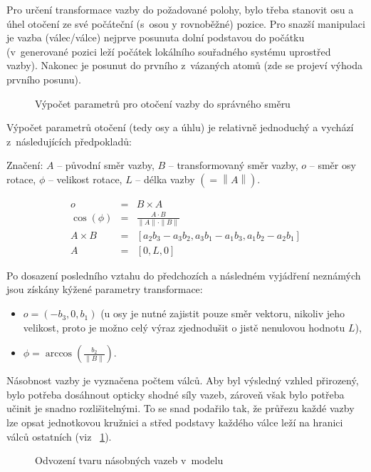 Pro určení transformace vazby do požadované polohy, bylo třeba stanovit osu a
úhel otočení ze své počáteční (s~osou y rovnoběžné) pozice. Pro snazší
manipulaci je vazba (válec/válce) nejprve posunuta dolní podstavou do po\-čát\-ku
(v~generované pozici leží počátek lokálního souřadného systému uprostřed vazby).
Nakonec je posunut do prvního z~vázaných atomů (zde se projeví výhoda prvního
posunu).

\begin{figure}[h]
	\caption{Výpočet parametrů pro otočení vazby do správného směru}
\end{figure}

Výpočet parametrů otočení (tedy osy a úhlu) je relativně jednoduchý a vychází
z~následujících předpokladů:

Značení: $A$ -- původní směr vazby,
		 $B$ -- transformovaný směr vazby,
		 $o$ -- směr osy rotace,
		 $\phi$ -- velikost rotace,
		 $L$ -- délka vazby $\left(=\left\|A\right\|\right)$.

\zlom
\begin{eqnarray*}
o&=&B \times A \\
\cos (\phi) &=& \frac{A\cdot B}{\|A\|\cdot \|B\|} \\
A \times B &=& \left[ a_2 b_3 - a_3 b_2, a_3 b_1 - a_1 b_3, a_1 b_2 - a_2 b_1 \right] \\
A &=& \left[ 0, L, 0\right]
\end{eqnarray*}

Po dosazení posledního vztahu do předchozích a následném vyjádření neznámých
jsou získány kýžené parametry transformace:
\begin{itemize}
	\item $o=\left(-b_3, 0, b_1\right)$ (u osy je nutné zajistit pouze směr
		  vektoru, nikoliv jeho velikost, proto je možno celý výraz zjednodušit
		  o jistě nenulovou hodnotu $L$),
	\item $\phi = \arccos \left(\frac{b_2}{\|B\|}\right)$.
\end{itemize}

Násobnost vazby je vyznačena počtem válců. Aby byl výsledný vzhled přirozený,
bylo potřeba dosáhnout opticky shodné síly vazeb, zároveň však bylo potřeba
učinit je snadno rozlišitelnými. To se snad podařilo tak, že průřezu každé vazby
lze opsat jednotkovou kružnici a střed podstavy každého válce leží na hranici
válců ostatních (viz {\figurename}~\ref{pic:vazba}).

\begin{figure}[h]
	\caption{Odvození tvaru násobných vazeb v~modelu}\label{pic:vazba}
\end{figure}

